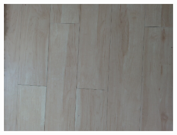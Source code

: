 \begin{figure}[h!tb]
\begin{subfigure}[b]{0.25\textwidth}
    \end{subfigure}%
    \begin{subfigure}[b]{0.25\textwidth}
        \centering
        \includegraphics[width=0.9\linewidth]{images/materials/wood-cam}
    \end{subfigure}%


\end{figure}
